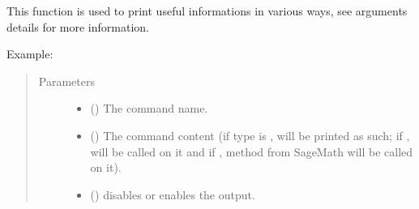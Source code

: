 \documentclass[letterpaper,10pt,english]{sphinxmanual}
\begin{document}
\begin{fulllineitems}
\label{\detokenize{run_circuit:run_circuit.output_commant}}
This function is used to print useful informations in various ways, see 
arguments details for more information.
\begin{description}
\item[{Example:}] \leavevmode
{}%
\begin{sphinxVerbatim}[commandchars=\\\{\},formatcom=\footnotesize]
\PYG{p}{[}\PYG{p}{]} 
\end{sphinxVerbatim}

\end{description}
\begin{quote}\begin{description}
\item[{Parameters}] \leavevmode\begin{itemize}
\item {} 
 () \textendash{} The command name.

\item {} 
 () \textendash{} The command content (if type is , will be printed 
as such; if ,  will be called on it and if 
,  method from SageMath will be called on it).

\item {} 
 () \textendash{} disables or enables the output.


\end{itemize}
\end{description}
\end{quote}
\end{fulllineitems}
\end{document}
